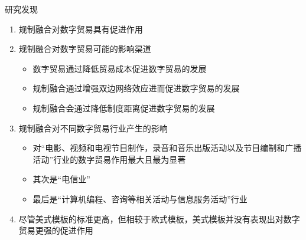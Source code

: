 \documentclass{beamer}
\begin{document}
\begin{frame}{研究发现}
    \begin{enumerate}
        \item 规制融合对数字贸易具有促进作用
        \item 规制融合对数字贸易可能的影响渠道
        \begin{itemize}
            \item 数字贸易通过降低贸易成本促进数字贸易的发展
            \item 规制融合通过增强双边网络效应进而促进数字贸易的发展
            \item 规制融合会通过降低制度距离促进数字贸易的发展
        \end{itemize}
        \item 规制融合对不同数字贸易行业产生的影响
        \begin{itemize}
            \item 对“电影、视频和电视节目制作，录音和音乐出版活动以及节目编制和广播活动”行业的数字贸易作用最大且最为显著
            \item 其次是“电信业”
            \item 最后是“计算机编程、咨询等相关活动与信息服务活动”行业
        \end{itemize}
        \item 尽管美式模板的标准更高，但相较于欧式模板，美式模板并没有表现出对数字贸易更强的促进作用
    \end{enumerate}
\end{frame}
\end{document}
